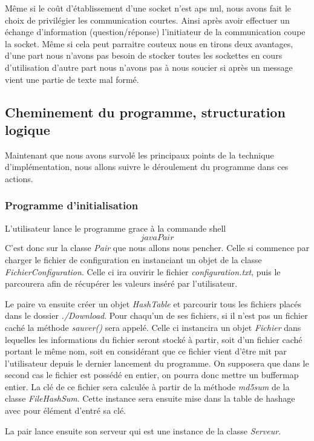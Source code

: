 Même si le coût d'établissement d'une socket n'est aps nul, nous avons
fait le choix de privilégier les communication courtes. Ainsi après
avoir effectuer un échange d'information (question/réponse)
l'initiateur de la communication coupe la socket. Même si cela peut
parraitre couteux nous en tirons deux avantages, d'une part nous
n'avons pas besoin de stocker toutes les sockettes en cours
d'utilisation d'autre part nous n'avons pas à nous soucier si après un
message vient une partie de texte mal formé.


\subsection{Cheminement du programme, structuration logique}
Maintenant que nous avons survolé les principaux points de la
technique d'implémentation, nous allons suivre le déroulement du
programme dans ces actions.

\subsubsection{Programme d'initialisation}
L'utilisateur lance le programme grace à la commande shell $$java
Pair$$ C'est donc sur la classe \textit{Pair} que nous allons nous
pencher. Celle si commence par charger le fichier de configuration en
instanciant un objet de la classe \textit{FichierConfiguration}. Celle
ci ira ouvirir le fichier \textit{configuration.txt}, puis le
parcourera afin de récupérer les valeurs inséré par l'utilisateur.

Le paire va ensuite créer un objet \textit{HashTable} et parcourir
tous les fichiers placés dans le dossier \textit{./Download}. Pour
chaqu'un de ses fichiers, si il n'est pas un fichier caché la méthode
\textit{sauver()} sera appelé. Celle ci instancira un objet
\textit{Fichier} dans lequelles les informations du fichier seront
stocké à partir, soit d'un fichier caché portant le même nom, soit en
considérant que ce fichier vient d'être mit par l'utilisateur depuis
le dernier lancement du programme. On supposera que dans le second cas
le fichier est possédé en entier, on pourra donc mettre un buffermap
entier. La clé de ce fichier sera calculée à partir de la méthode
\textit{md5sum} de la classe \textit{FileHashSum}. Cette instance sera
ensuite mise dans la table de hashage avec pour élément d'entré sa
clé.

La pair lance ensuite son serveur qui est une instance de la classe
\textit{Serveur}. 

